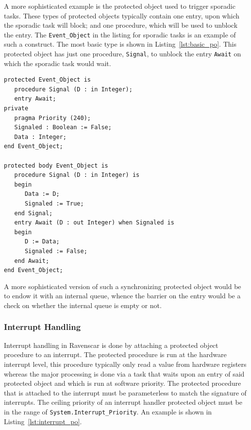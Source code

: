A more sophisticated example is the protected object used to trigger
sporadic tasks. These types of protected objects typically contain one
entry, upon which the sporadic task will block; and one procedure,
which will be used to unblock the entry. The \texttt{Event\_Object} in
the listing for sporadic tasks is an example of such a construct. The
most basic type is shown in Listing~\ref{lst:basic_po}. This protected
object has just one procedure, \texttt{Signal}, to unblock the entry
\texttt{Await} on which the sporadic task would wait.

\begin{minipage}{\listingwidth}
\lstset{language=ada,
  numbers=left,
  numberstyle=\tiny
}
\begin{lstlisting}[label=lst:basic_po, caption=A protected object used
    to synchronize two tasks with no data exchanged]
protected Event_Object is
   procedure Signal (D : in Integer);
   entry Await;
private
   pragma Priority (240);
   Signaled : Boolean := False;
   Data : Integer;
end Event_Object;

protected body Event_Object is
   procedure Signal (D : in Integer) is
   begin
      Data := D;
      Signaled := True;
   end Signal;
   entry Await (D : out Integer) when Signaled is
   begin
      D := Data;
      Signaled := False;
   end Await;
end Event_Object;
\end{lstlisting}
\end{minipage}

A more sophisticated version of such a synchronizing protected object
would be to endow it with an internal queue, whence the barrier on the
entry would be a check on whether the internal queue is empty or not.

\subsubsection{Interrupt Handling}
Interrupt handling in Ravenscar is done by attaching a protected
object procedure to an interrupt. The protected procedure is run at
the hardware interrupt level, this procedure typically only read a
value from hardware registers whereas the major processing is done via
a task that waits upon an entry of said protected object and which is
run at software priority. The protected procedure that is attached to
the interrupt must be parameterless to match the signature of
interrupts. The ceiling priority of an interrupt handler protected
object must be in the range of \texttt{System.Interrupt\_Priority}. An
example is shown in Listing~\ref{lst:interrupt_po}.

